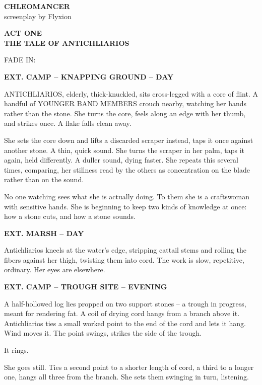 \documentclass[12pt]{article}
\newcommand{\sceneheading}[1]{%
  \bigskip\noindent\textbf{#1}\par\smallskip
}
\newcommand{\action}[1]{%
  \noindent #1\par\medskip
}
\newcommand{\actbreak}[1]{%
  \clearpage\thispagestyle{empty}\vspace*{3in}
  \begin{center}{\Large\textbf{#1}}\end{center}
  \clearpage
}
\begin{document}
\begin{titlepage}
\thispagestyle{empty}
\vspace*{3in}
\begin{center}
{\LARGE \textbf{CHLEOMANCER}}\\[1em]
screenplay by Flyxion
\end{center}
\vfill
\end{titlepage}

\setcounter{page}{1}

\actbreak{ACT ONE\\ \large THE TALE OF ANTICHLIARIOS}

FADE IN:

\sceneheading{EXT. CAMP -- KNAPPING GROUND -- DAY}

\action{ANTICHLIARIOS, elderly, thick-knuckled, sits cross-legged with a core of flint. A handful of YOUNGER BAND MEMBERS crouch nearby, watching her hands rather than the stone. She turns the core, feels along an edge with her thumb, and strikes once. A flake falls clean away.}

\action{She sets the core down and lifts a discarded scraper instead, taps it once against another stone. A thin, quick sound. She turns the scraper in her palm, taps it again, held differently. A duller sound, dying faster. She repeats this several times, comparing, her stillness read by the others as concentration on the blade rather than on the sound.}

\action{No one watching sees what she is actually doing. To them she is a craftswoman with sensitive hands. She is beginning to keep two kinds of knowledge at once: how a stone cuts, and how a stone sounds.}

\sceneheading{EXT. MARSH -- DAY}

\action{Antichliarios kneels at the water's edge, stripping cattail stems and rolling the fibers against her thigh, twisting them into cord. The work is slow, repetitive, ordinary. Her eyes are elsewhere.}

\sceneheading{EXT. CAMP -- TROUGH SITE -- EVENING}

\action{A half-hollowed log lies propped on two support stones -- a trough in progress, meant for rendering fat. A coil of drying cord hangs from a branch above it. Antichliarios ties a small worked point to the end of the cord and lets it hang. Wind moves it. The point swings, strikes the side of the trough.}

\action{It rings.}

\action{She goes still. Ties a second point to a shorter length of cord, a third to a longer one, hangs all three from the branch. She sets them swinging in turn, listening.}
\end{document}
